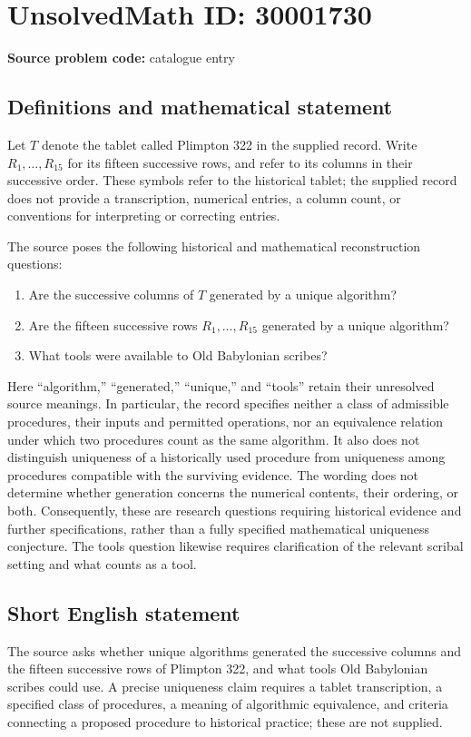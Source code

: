 \documentclass[11pt]{article}
\begin{document}
\section*{UnsolvedMath ID: 30001730}
\textbf{Source problem code:} catalogue entry
\subsection{Definitions and mathematical statement}
Let \(T\) denote the tablet called Plimpton 322 in the supplied record. Write \(R_1,\ldots,R_{15}\) for its fifteen successive rows, and refer to its columns in their successive order. These symbols refer to the historical tablet; the supplied record does not provide a transcription, numerical entries, a column count, or conventions for interpreting or correcting entries.

The source poses the following historical and mathematical reconstruction questions:
\begin{enumerate}
\item Are the successive columns of \(T\) generated by a unique algorithm?
\item Are the fifteen successive rows \(R_1,\ldots,R_{15}\) generated by a unique algorithm?
\item What tools were available to Old Babylonian scribes?
\end{enumerate}

Here ``algorithm,'' ``generated,'' ``unique,'' and ``tools'' retain their unresolved source meanings. In particular, the record specifies neither a class of admissible procedures, their inputs and permitted operations, nor an equivalence relation under which two procedures count as the same algorithm. It also does not distinguish uniqueness of a historically used procedure from uniqueness among procedures compatible with the surviving evidence. The wording does not determine whether generation concerns the numerical contents, their ordering, or both. Consequently, these are research questions requiring historical evidence and further specifications, rather than a fully specified mathematical uniqueness conjecture. The tools question likewise requires clarification of the relevant scribal setting and what counts as a tool.
\subsection{Short English statement}
The source asks whether unique algorithms generated the successive columns and the fifteen successive rows of Plimpton 322, and what tools Old Babylonian scribes could use. A precise uniqueness claim requires a tablet transcription, a specified class of procedures, a meaning of algorithmic equivalence, and criteria connecting a proposed procedure to historical practice; these are not supplied.
\end{document}
